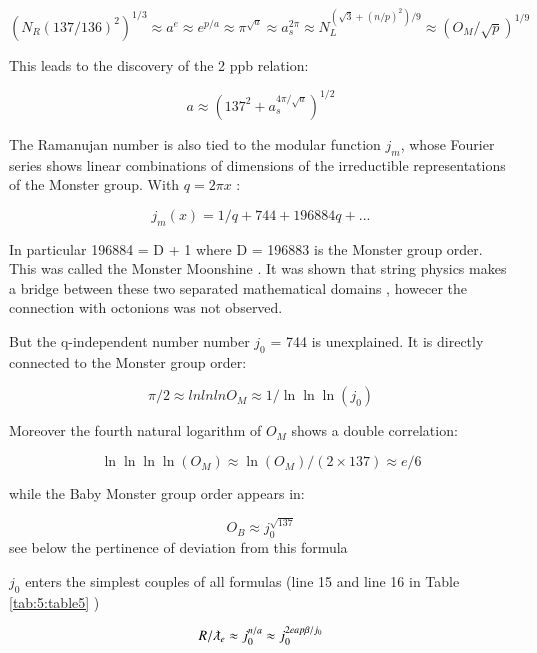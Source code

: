 \documentclass[a4paper,9pt]{article}
\begin{document}
\begin{equation}
(N_R (137/136)^2)^{1/3} \approx a^e \approx e^{p/a} \approx \pi^{\sqrt a} \approx a_s^{2\pi} \approx N_L^{(\sqrt3 +(n/p)^2)/9} \approx (O_M/\sqrt p)^{1/9}
\end{equation}

This leads to the discovery of the 2 ppb relation:

\begin{equation}
a \approx (137^2 + a_s^{4\pi/\sqrt a})^{1/2}
\end{equation}

The Ramanujan number is also tied to the modular function $j_m$, whose Fourier series shows linear combinations of dimensions of the irreductible representations of the Monster group. With $q = 2\pi x$ :

\begin{equation}
j_m(x) = 1/q + 744 + 196884 q + ...
\end{equation}

In particular 196884 = D + 1 where D = 196883 is the Monster group order. This was called the Monster Moonshine \cite{Conway}. It was shown that string physics makes a bridge between these two separated mathematical domains \cite{Borcherds}, howecer the connection with octonions was not observed. 


But the q-independent number number $j_0$ = 744 is unexplained. It is directly connected to the Monster group order:

 \begin{equation}
 \pi/2 \approx lnlnlnO_M \approx 1/\ln\ln\ln(j_0)
\end{equation}

Moreover the fourth natural logarithm of $O_M$ shows a double correlation:

 \begin{equation}
 \ln\ln\ln\ln(O_M) \approx \ln(O_M) /(2\times 137) \approx e/6
\end{equation}

while the Baby Monster group order appears in:

\begin{equation}
 O_B \approx j_0^{\sqrt{137}}
\end{equation}
see below the pertinence of deviation from this formula

$j_0$ enters the simplest couples of all formulas (line 15 and line 16 in 
 Table \ref{tab:5:table5} )
 
 \begin{equation}
 R/\lambdabar_e \approx j_0^{n/a} \approx j_0^{2eap\beta/j_0} 
\end{equation}
\end{document}
